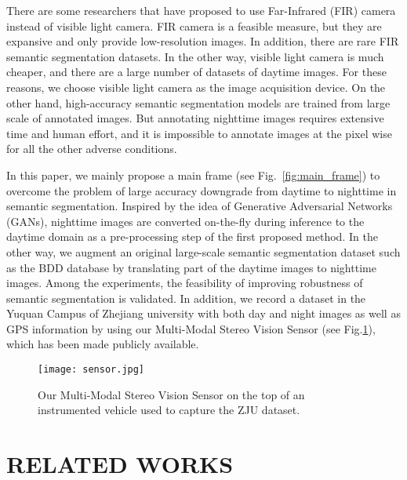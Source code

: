 \documentclass[a4paper]{spie}
\begin{document}
There are some researchers that have proposed to use Far-Infrared (FIR) camera instead of visible light camera\cite{li2019segmenting}. FIR camera is a feasible measure, but they are expansive and only provide low-resolution images. In addition, there are rare FIR semantic segmentation datasets. In the other way, visible light camera is much cheaper, and there are a large number of datasets of daytime images. For these reasons, we choose visible light camera as the image acquisition device. On the other hand, high-accuracy semantic segmentation models are trained from large scale of annotated images. But annotating nighttime images requires extensive time and human effort, and it is impossible to annotate images at the pixel wise for all the other adverse conditions.

In this paper, we mainly propose a main frame (see Fig.~\ref{fig:main_frame}) to overcome the problem of large accuracy downgrade from daytime to nighttime in semantic segmentation. Inspired by the idea of Generative Adversarial Networks (GANs)\cite{goodfellow2014generative}, nighttime images are converted on-the-fly during inference to the daytime domain as a pre-processing step of the first proposed method. In the other way, we augment an original large-scale semantic segmentation dataset such as the BDD database\cite{yu2018bdd100k} by translating part of the daytime images to nighttime images. Among the experiments, the feasibility of improving robustness of semantic segmentation is validated. In addition, we record a dataset in the Yuquan Campus of Zhejiang university with both day and night images as well as GPS information by using our Multi-Modal Stereo Vision Sensor\cite{sun2019multi} (see Fig.\ref{fig:sensor}), which has been made publicly available.

\begin{figure}[ht]
   \centering
   \texttt{[image: sensor.jpg]}
   \caption{\label{fig:sensor}
   Our Multi-Modal Stereo Vision Sensor on the top of an instrumented vehicle used to capture the ZJU dataset.}
\end{figure}

\section{RELATED WORKS} 
\end{document}
